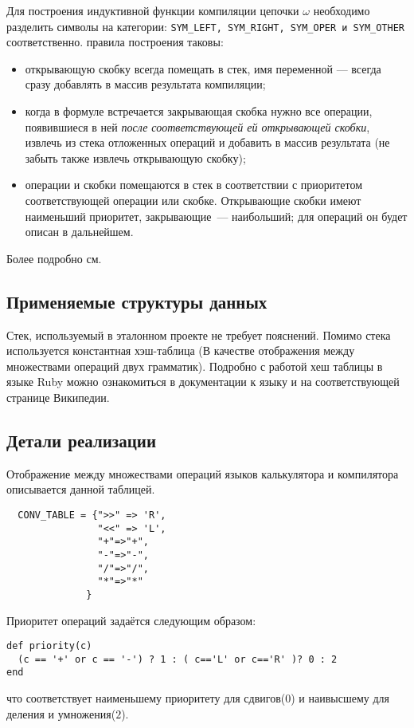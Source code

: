 Для построения индуктивной функции компиляции цепочки $\omega$ необходимо разделить
символы на категории: \verb|SYM_LEFT, SYM_RIGHT, SYM_OPER и SYM_OTHER| соответственно.
правила построения таковы:
\begin{itemize}
  \item открывающую скобку всегда помещать в стек, имя переменной --- всегда
  сразу добавлять в массив результата компиляции;
  \item когда в формуле встречается закрывающая скобка нужно все операции,
  появившиеся в ней \emph{после соответствующей ей открывающей скобки}, извлечь
  из стека отложенных операций и добавить в массив результата
  (не забыть также извлечь открывающую скобку);
  \item операции и скобки помещаются в стек в соответствии с приоритетом
  соответствующей операции или скобке. Открывающие скобки имеют наименьший приоритет,
  закрывающие~--- наибольший; для операций он будет описан в дальнейшем.
\end{itemize}
Более подробно см. \cite{compf}

\subsection{Применяемые структуры данных}
Стек, используемый в эталонном проекте не требует пояснений.
Помимо стека используется константная хэш-таблица (В качестве отображения
между множествами операций двух грамматик). Подробно с работой хеш таблицы в языке
Ruby можно ознакомиться в документации к языку \cite{rubydoc} и на соответствующей
странице Википедии.

\subsection{Детали реализации}

Отображение между множествами операций языков калькулятора и компилятора описывается
данной таблицей.
\begin{lstlisting}
  CONV_TABLE = {">>" => 'R',
                "<<" => 'L',
                "+"=>"+",
                "-"=>"-",
                "/"=>"/",
                "*"=>"*"
              }
\end{lstlisting}

Приоритет операций задаётся следующим образом:
\begin{lstlisting}
def priority(c)
  (c == '+' or c == '-') ? 1 : ( c=='L' or c=='R' )? 0 : 2
end
\end{lstlisting}
что соответствует наименьшему приоритету для сдвигов($0$) и наивысшему для
деления и умножения($2$).

